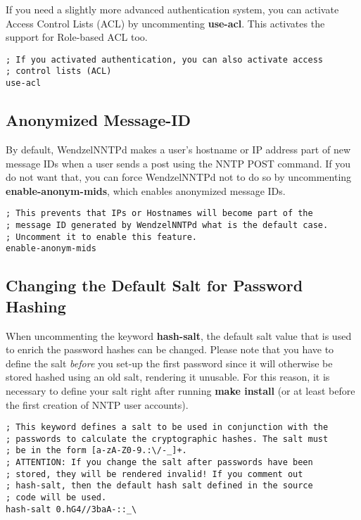 If you need a slightly more advanced authentication system, you can activate Access Control Lists (ACL) by uncommenting \textbf{use-acl}. This activates the support for Role-based ACL too.

\begin{verbatim}
; If you activated authentication, you can also activate access
; control lists (ACL)
use-acl
\end{verbatim}

\subsection{Anonymized Message-ID}

By default, WendzelNNTPd makes a user's hostname or IP address part of new message IDs when a user sends a post using the NNTP POST command. If you do not want that, you can force WendzelNNTPd not to do so by uncommenting \textbf{enable-anonym-mids}, which enables anonymized message IDs.

\begin{verbatim}
; This prevents that IPs or Hostnames will become part of the
; message ID generated by WendzelNNTPd what is the default case.
; Uncomment it to enable this feature.
enable-anonym-mids
\end{verbatim}

\subsection{Changing the Default Salt for Password Hashing}

When uncommenting the keyword \textbf{hash-salt}, the default salt value that is used to enrich the password hashes can be changed. Please note that you have to define the salt \textit{before} you set-up the first password since it will otherwise be stored hashed using an old salt, rendering it unusable. For this reason, it is necessary to define your salt right after running \textbf{make install} (or at least before the first creation of NNTP user accounts).

\begin{verbatim}
; This keyword defines a salt to be used in conjunction with the
; passwords to calculate the cryptographic hashes. The salt must
; be in the form [a-zA-Z0-9.:\/-_]+.
; ATTENTION: If you change the salt after passwords have been
; stored, they will be rendered invalid! If you comment out
; hash-salt, then the default hash salt defined in the source
; code will be used.
hash-salt 0.hG4//3baA-::_\
\end{verbatim}


